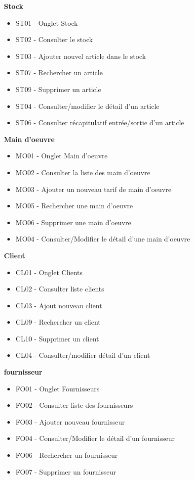 \newpara
\textbf{Stock}
\begin{itemize}
  \item \checkmark ST01 - Onglet Stock
  \item \checkmark ST02 - Consulter le stock
  \item \checkmark ST03 - Ajouter nouvel article dans le stock
  \item \checkmark ST07 - Rechercher un article
  \item \checkmark ST09 - Supprimer un article
  \item \checkmark ST04 - Consulter/modifier le détail d'un article
  \item \checkmark ST06 - Consulter récapitulatif entrée/sortie d'un article
\end{itemize}

\newpara
\textbf{Main d'oeuvre}
\begin{itemize}
  \item \checkmark MO01 - Onglet Main d'oeuvre
  \item \checkmark MO02 - Consulter la liste des main d'oeuvre
  \item \checkmark MO03 - Ajouter un nouveau tarif de main d'oeuvre
  \item \checkmark MO05 - Rechercher une main d'oeuvre
  \item \checkmark MO06 - Supprimer une main d'oeuvre
  \item \checkmark MO04 - Consulter/Modifier le détail d'une main d'oeuvre
\end{itemize}

\newpara
\textbf{Client}
\begin{itemize}
  \item \checkmark CL01 - Onglet Clients
  \item \checkmark CL02 - Consulter liste clients
  \item \checkmark CL03 - Ajout nouveau client
  \item \checkmark CL09 - Rechercher un client 
  \item \checkmark CL10 - Supprimer un client
  \item \checkmark CL04 - Consulter/modifier détail d'un client
\end{itemize}

\newpage

\textbf{fournisseur}
\begin{itemize}
  \item \checkmark FO01 - Onglet Fournisseurs
  \item \checkmark FO02 - Consulter liste des fournisseurs
  \item \checkmark FO03 - Ajouter nouveau fournisseur
  \item \checkmark FO04 - Consulter/Modifier le détail d'un fournisseur
  \item \checkmark FO06 - Rechercher un fournisseur
  \item \checkmark FO07 - Supprimer un fournisseur
\end{itemize}

